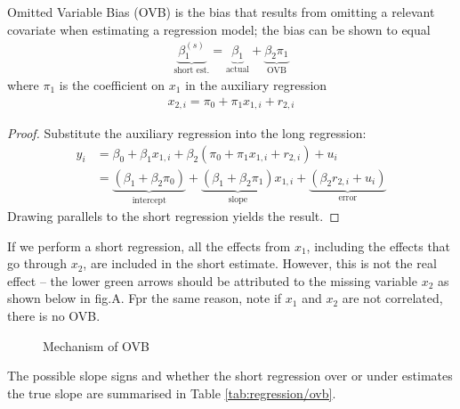             \begin{theorem}[OVB]
                Omitted Variable Bias (OVB) is the bias that results from omitting a relevant covariate when estimating a regression model; the bias can be shown to equal
                \begin{align}
                    \underbrace{\beta_1^{(s)}}_\text{short est.}= \underbrace{\beta_1}_\text{actual} + \underbrace{\beta_2 \pi_1}_\text{OVB}
                \end{align}
                where $\pi_1$ is the coefficient on $x_1$ in the auxiliary regression
                \begin{align}
                    x_{2,i} = \pi_0 + \pi_1 x_{1,i} + r_{2,i}
                \end{align}
            \end{theorem}
            \begin{proof}
                Substitute the auxiliary regression into the long regression:
                \begin{align}
                    y_i
                    &= \beta_0 +\beta_1 x_{1,i} +\beta_2 (\pi_0 + \pi_1 x_{1,i} + r_{2,i})+ u_i \\
                    &= \underbrace{(\beta_1 + \beta_2\pi_0)}_\text{intercept} +  \underbrace{(\beta_1+\beta_2 \pi_1)}_\text{slope}x_{1,i} + \underbrace{(\beta_2r_{2,i}+u_i)}_\text{error}
                \end{align}
                Drawing parallels to the short regression yields the result.
            \end{proof}
            
            If we perform a short regression, all the effects from $x_1$, including the effects that go through $x_2$, are included in the short estimate. However, this is not the real effect – the lower green arrows should be attributed to the missing variable $x_2$ as shown below in fig.A. Fpr the same reason, note if $x_1$ and $x_2$ are not correlated, there is no OVB.
            \begin{figure}[h]
                \centering
                
                \caption{Mechanism of OVB}
                \label{fig:regression/ovb}
            \end{figure}
            
            The possible slope signs and whether the short regression over or under estimates the true slope are summarised in Table \ref{tab:regression/ovb}.
            
